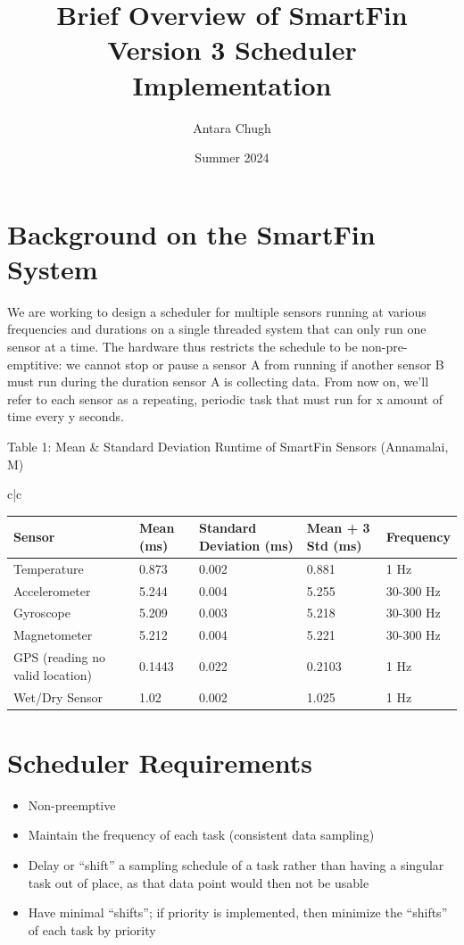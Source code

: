\documentclass{article}
\title{Brief Overview of SmartFin Version 3 Scheduler Implementation}
\author{Antara Chugh} \and {Charlie Kushelevy} \and {Meena Annamalai}  \and {Hannah Cutler} \and {Nathan Hui} \and {Ryan Katsner}
\date{Summer 2024}
\begin{document}
\maketitle

\section{Background on the SmartFin System}

We are working to design a scheduler for multiple sensors running at various frequencies and durations on a single threaded system that can only run one sensor at a time. The hardware thus restricts the schedule to be non-pre-emptitive: we cannot stop or pause a sensor A from running if another sensor B must run during the duration sensor A is collecting data. From now on, we’ll refer to each sensor as a repeating, periodic task that must run for x amount of time every y seconds. 


\caption{Table 1: Mean \& Standard Deviation Runtime of SmartFin Sensors (Annamalai, M)}




\begin{tabular}{c|c}
\hspace{-3 cm}
\begin{tabular}{| l | l | l | l | l |}
\hline
Sensor & Mean (ms) & Standard Deviation (ms) & Mean + 3 Std (ms) & Frequency \\
\hline
Temperature & 0.873 & 0.002 & 0.881 & 1 Hz \\
\hline
Accelerometer & 5.244 & 0.004 & 5.255 & 30-300 Hz \\
\hline
Gyroscope & 5.209 & 0.003 & 5.218 & 30-300 Hz \\
\hline
Magnetometer & 5.212 & 0.004 & 5.221 & 30-300 Hz \\
\hline
GPS (reading no valid location) & 0.1443 & 0.022 & 0.2103 & 1 Hz \\
\hline
Wet/Dry Sensor & 1.02 & 0.002 & 1.025 & 1 Hz \\
\hline

\end{tabular}

\end{tabular}





\section{Scheduler Requirements}
\begin{itemize}
    \item Non-preemptive 
    \item Maintain the frequency of each task (consistent data  sampling) 
    \item Delay or “shift” a sampling schedule of a task rather than having a singular task out of place, as that data point would then not be usable 
    \item Have minimal “shifts”; if priority is implemented, then minimize the “shifts” of each task by priority
\end{itemize}
\end{document}
